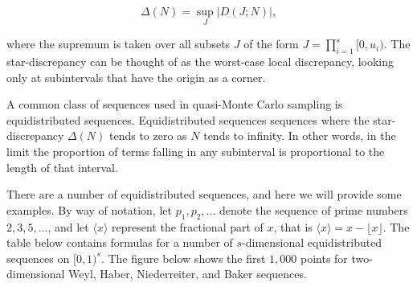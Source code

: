 \documentclass[11pt]{article}
\begin{document}
\begin{equation}\label{EqQMCGlobalDiscrep}
  \Delta(N)=\sup_J |D(J;N)|,
\end{equation}

where the supremum is taken over all subsets \(J\) of the form
\(J=\prod_{i=1}^s[0,u_i)\). The star-discrepancy can be thought of as
the worst-case local discrepancy, looking only at subintervals that have
the origin as a corner.

A common class of sequences used in quasi-Monte Carlo sampling is
equidistributed sequences. Equidistributed sequences sequences where the
star-discrepancy \(\Delta(N)\) tends to zero as \(N\) tends to infinity.
In other words, in the limit the proportion of terms falling in any
subinterval is proportional to the length of that interval.

There are a number of equidistributed sequences, and here we will
provide some examples. By way of notation, let \(p_1, p_2, \ldots\)
denote the sequence of prime numbers \(2,3,5,\ldots\), and let
\(\langle x\rangle\) represent the fractional part of \(x\), that is
\(\langle x\rangle = x - \lfloor x\rfloor\). The table below contains
formulas for a number of \(s\)-dimensional equidistributed sequences on
\([0,1)^s\). The figure below shows the first \(1,000\) points for
two-dimensional Weyl, Haber, Niederreiter, and Baker sequences.
\end{document}
